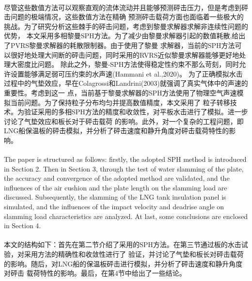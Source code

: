 \documentclass[UTF8]{ctexart}
\begin{document}
\paragraph{\quad}尽管这些数值方法可以观察直观的流体流动并且能够预测砰击压力，但是考虑到砰击问题的极端情况，这些数值方法在精确
                预测砰击载荷方面也面临着一些极大的挑战。为了研究分析这些棘手的砰击问题，考虑到黎曼求解器求解非连续性问题的优势，
                本文采用多相黎曼SPH方法。为了减少由黎曼求解器引起的数值耗散,给出了PVRS黎曼求解器的耗散限制器。由于使用了黎曼
                求解器，当前的SPH方法可以很好地处理大间断的砰击问题，同时采用的RVRS近似黎曼求解器能够更好地处理大密度比问题。
                除此之外，黎曼-SPH方法使得稳定性约束不那么苛刻，同时允许设置能够满足弱可压约束的水声速(Hammani et al.,2020)。
                为了正确模拟水击过程中的气垫效应，早在Colagrossi和Landrini(2003)就强调了真实气体中的声速的重要性。考虑到这一
                点，当前基于黎曼求解器的SPH方法使用了物理空气声速模拟当前问题。为了保持粒子分布均匀并提高数值精度，本文采用了
                粒子转移技术。为验证采用的多相SPH方法的精度和收敛性，对平板水击进行了模拟。进一步讨论了气垫效应和板长对于砰击载荷
                的影响。此外，对一个复杂的工程问题，即LNG船保温板的砰击模拟，并分析了砰击速度和静升角度对砰击载荷特性的影响。
\paragraph{\quad}The paper is structured as follows: firstly, the adopted SPH method is introduced in 
                Section 2. Then in Section 3, through the test of water slamming of the plate, the 
                accuracy and convergence of the adopted method are validated, and the influences of 
                the air cushion and the plate length on the slamming load are discussed. Subsequently, 
                the slamming of the LNG tank insulation panel is simulated, and the influences of the 
                impact velocity and deadrise angle on slamming load characteristics are analyzed. At 
                last, some conclusions are enclosed in Section 4.
\paragraph{\quad}本文的结构如下：首先在第二节介绍了采用的SPH方法。在第三节通过板的水击试验，对采用方法的精确性和收敛性进行了
                验证，并讨论了气垫和板长对砰击载荷的影响。随后，对LNG船的保温板砰击进行模拟，并分析了砰击速度和静升角度对砰击
                载荷特性的影响。最后，在第4节中给出了一些结论。
\end{document}
